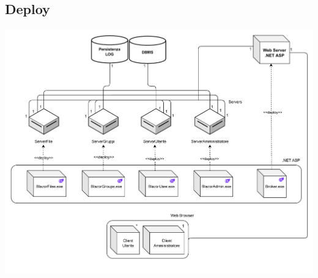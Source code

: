 \vspace{1cm}
\subsection*{Deploy}
{}
\vspace{0.5cm}
\begin{adjustwidth}{-3cm}{0cm}
\includegraphics[scale=0.8]{deployment/Diagramma-Sequenza-Deploy.drawio.pdf}
\end{adjustwidth}